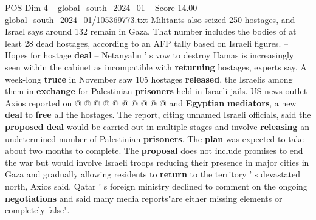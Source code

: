 \begin{textsample}{POS Dim 4 – global\_south\_2024\_01 – Score 14.00 – global\_south\_2024\_01/105369773.txt}
Militants also seized 250 hostages, and Israel says around 132 remain in Gaza.
That number includes the bodies of at least 28 dead hostages, according to an AFP tally based on Israeli figures. -- Hopes for hostage \textbf{deal} -- Netanyahu ' s vow to destroy Hamas is increasingly seen within the cabinet as incompatible with \textbf{returning} hostages, experts say.
A week-long \textbf{truce} in November saw 105 hostages \textbf{released}, the Israelis among them in \textbf{exchange} for Palestinian \textbf{prisoners} held in Israeli jails.
US news outlet Axios reported on @ @ @ @ @ @ @ @ @ @ and \textbf{Egyptian} \textbf{mediators}, a new \textbf{deal} to \textbf{free} all the hostages.
The report, citing unnamed Israeli officials, said the \textbf{proposed} \textbf{deal} would be carried out in multiple stages and involve \textbf{releasing} an undetermined number of Palestinian \textbf{prisoners}.
The \textbf{plan} was expected to take about two months to complete.
The \textbf{proposal} does not include promises to end the war but would involve Israeli troops reducing their presence in major cities in Gaza and gradually allowing residents to \textbf{return} to the territory ' s devastated north, Axios said.
Qatar ' s foreign ministry declined to comment on the ongoing \textbf{negotiations} and said many media reports"are either missing elements or completely false".

\end{textsample}
